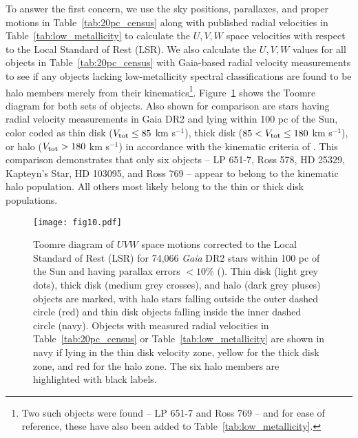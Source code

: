 \documentclass[twocolumn,tighten,twocolappendix]{aastex631}
\begin{document}
To answer the first concern, we use the sky positions, parallaxes, and proper motions in Table~\ref{tab:20pc_census} along with published radial velocities in Table~\ref{tab:low_metallicity} to calculate the $U,V,W$ space velocities with respect to the Local Standard of Rest (LSR). We also calculate the $U, V, W$ values for all objects in Table~\ref{tab:20pc_census} with Gaia-based radial velocity measurements to see if any objects lacking low-metallicity spectral classifications are found to be halo members merely from their kinematics\footnote{Two such objects were found -- LP 651-7 and Ross 769 -- and for ease of reference, these have also been added to Table~\ref{tab:low_metallicity}.}. Figure~\ref{fig:toomre_hot_stars} shows the Toomre diagram for both sets of objects. Also shown for comparison are stars having radial velocity measurements in Gaia DR2 and lying within 100 pc of the Sun, color coded as thin disk ($V_{\rm tot} \le 85$ km s$^{-1}$), thick disk ($85 < V_{\rm tot} \le 180$ km s$^{-1}$), or halo ($V_{\rm tot} > 180$ km s$^{-1}$) in accordance with the kinematic criteria of \cite{nissen2004}. This comparison demonstrates that only six objects -- LP 651-7, Ross 578, HD 25329, Kapteyn's Star, HD 103095, and Ross 769 -- appear to belong to the kinematic halo population. All others most likely belong to the thin or thick disk populations.

\begin{figure}
\texttt{[image: fig10.pdf]}
\caption{Toomre diagram of $UVW$ space motions corrected to the Local Standard of Rest (LSR) for 74,066 {\it Gaia} DR2 stars within 100 pc of the Sun and having parallax errors $< 10\%$ (\citealt{kirkpatrick2021b}). Thin disk (light grey dots), thick disk (medium grey crosses), and halo (dark grey pluses) objects are marked, with halo stars falling outside the outer dashed circle (red) and thin disk objects falling inside the inner dashed circle (navy). Objects with measured radial velocities in Table~\ref{tab:20pc_census} or Table~\ref{tab:low_metallicity} are shown in navy if lying in the thin disk velocity zone, yellow for the thick disk zone, and red for the halo zone. The six halo members are highlighted with black labels. \label{fig:toomre_hot_stars}}
\end{figure}
\end{document}
